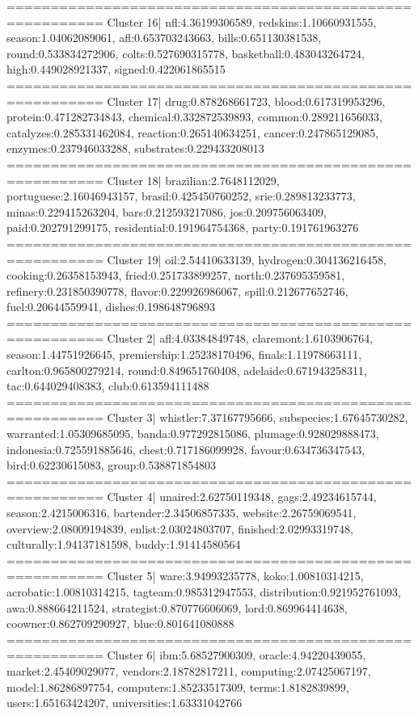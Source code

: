 ========================================================= 
Cluster 16| nfl:4.36199306589, redskins:1.10660931555, season:1.04062089061, afl:0.653703243663, bills:0.651130381538, round:0.533834272906, colts:0.527690315778, basketball:0.483043264724, high:0.449028921337, signed:0.422061865515
========================================================= 
Cluster 17| drug:0.878268661723, blood:0.617319953296, protein:0.471282734843, chemical:0.332872539893, common:0.289211656033, catalyzes:0.285331462084, reaction:0.265140634251, cancer:0.247865129085, enzymes:0.237946033288, substrates:0.229433208013
========================================================= 
Cluster 18| brazilian:2.7648112029, portuguese:2.16046943157, brasil:0.425450760252, srie:0.289813233773, minas:0.229415263204, bars:0.212593217086, jos:0.209756063409, paid:0.202791299175, residential:0.191964754368, party:0.191761963276
========================================================= 
Cluster 19| oil:2.54410633139, hydrogen:0.304136216458, cooking:0.26358153943, fried:0.251733899257, north:0.237695359581, refinery:0.231850390778, flavor:0.229926986067, spill:0.212677652746, fuel:0.20644559941, dishes:0.198648796893
========================================================= 
Cluster 2| afl:4.03384849748, claremont:1.6103906764, season:1.44751926645, premiership:1.25238170496, finals:1.11978663111, carlton:0.965800279214, round:0.849651760408, adelaide:0.671943258311, tac:0.644029408383, club:0.613594111488
========================================================= 
Cluster 3| whistler:7.37167795666, subspecies:1.67645730282, warranted:1.05309685095, banda:0.977292815086, plumage:0.928029888473, indonesia:0.725591885646, chest:0.717186099928, favour:0.634736347543, bird:0.62230615083, group:0.538871854803
========================================================= 
Cluster 4| unaired:2.62750119348, gags:2.49234615744, season:2.4215006316, bartender:2.34506857335, website:2.26759069541, overview:2.08009194839, enlist:2.03024803707, finished:2.02993319748, culturally:1.94137181598, buddy:1.91414580564
========================================================= 
Cluster 5| ware:3.94993235778, koko:1.00810314215, acrobatic:1.00810314215, tagteam:0.985312947553, distribution:0.921952761093, awa:0.888664211524, strategist:0.870776606069, lord:0.869964414638, coowner:0.862709290927, blue:0.801641080888
========================================================= 
Cluster 6| ibm:5.68527900309, oracle:4.94220439055, market:2.45409029077, vendors:2.18782817211, computing:2.07425067197, model:1.86286897754, computers:1.85233517309, terms:1.8182839899, users:1.65163424207, universities:1.63331042766
